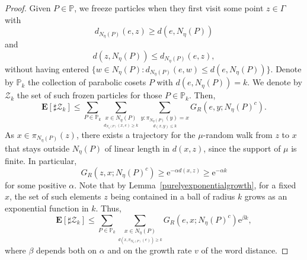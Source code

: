 \documentclass{amsart}
\newcommand{\showcomments}{yes}
\newenvironment{comment}%
{\ifthenelse{\equal{\showcomments}{yes}}%
{\footnotemark
    \begin{lrbox}{\commentbox}
    \begin{minipage}[t]{1.25in}\raggedright\sffamily\upshape\tiny
    \footnotemark[\arabic{footnote}]}%
{\begin{lrbox}{\commentbox}}}%
{\ifthenelse{\equal{\showcomments}{yes}}%
{\end{minipage}\end{lrbox}\marginpar{\usebox{\commentbox}}}%
{\end{lrbox}}}
\theoremstyle{definition}
\theoremstyle{remark}
\newcommand{\ywy}[1]{{\color{red}{#1}}}
\begin{document}
\begin{proof}
Given $P\in\mathbb P$, we freeze particles when they first visit some point $z\in \Gamma$ with
$$d_{N_\eta(P)}(e,z)\geq d(e,N_\eta(P))$$ and
$$d(z,N_\eta(P))\leq  d_{N_\eta(P)}(e,z),$$ without having entered $\{w\in N_\eta(P): d_{N_\eta(P)}(e,w)\leq d(e,N_\eta(P))\}$. Denote  by $\mathbb P_k$  the collection  of   parabolic cosets $P$  with $d(e,N_\eta(P))=k$.
We denote by $\mathcal{Z}_k$ the set of such frozen particles for those $P\in \mathbb P_k$.
Then,
$$\mathbf E[\sharp \mathcal{Z}_k]\leq \sum_{P\in \mathbb P_k}\sum_{\underset{d_{N_\eta(P)}(x,e)\geq k}{x\in N_\eta(P)} }\sum_{\underset{d(x,y)\leq k}{y \colon \pi_{N_\eta(P)}(y)=x}}G_R(e,y;N_\eta(P)^c).$$%
As $x\in \pi_{N_\eta(P)}(z)$,  there exists a trajectory for the $\mu$-random walk from $z$ to $x$ that stays outside $N_\eta(P)$ of linear length in $d(x,z)$, since the support of $\mu$ is finite.
In particular,
$$G_R(z,x;N_\eta(P)^c)\geq \mathrm{e}^{-\alpha d(x,z)}\ge \mathrm{e}^{-\alpha k}$$ for some positive $\alpha$.
Note that by Lemma~\ref{purelyexponentialgrowth}, for a fixed $x$, the set of such elements $z$ being contained in a ball of radius $k$ grows as an exponential function in $k$.  Thus,
\begin{equation}\label{proofexponentialmoments}
    \mathbf E[\sharp \mathcal{Z}_k]\leq \sum_{P\in\mathbb P_k}\sum_{\underset{d(x,\pi_{N_\eta(P)}(e))\geq k}{x\in N_\eta(P)} }G_R(e,x;N_\eta(P)^c)\mathrm{e}^{\beta k},
\end{equation}
where $\beta$ depends both on $\alpha$ and on the growth rate $v$ of the word distance.

\end{proof}
\end{document}
